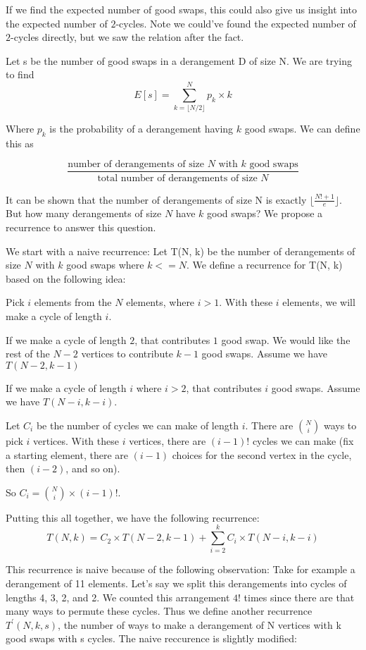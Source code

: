 \documentclass{article}
\begin{document}
If we find the expected number of good swaps, this could also give us insight into the expected number of $2$-cycles.
Note we could've found the expected number of $2$-cycles directly, but we saw the relation after the fact.

Let s be the number of good swaps in a derangement D of size N. We are trying to find
\[ E[s] = \sum_{k = \lfloor N/2 \rfloor}^{N} p_k \times k \]

Where $p_k$ is the probability of a derangement having $k$ good swaps. We can define this as

\[ \frac{\text{number of derangements of size $N$ with $k$ good swaps}}{\text{total number of derangements of size $N$}} \]

It can be shown that the number of derangements of size N is exactly $\lfloor \frac{N! + 1}{e} \rfloor$.
But how many derangements of size $N$ have $k$ good swaps? We propose a recurrence to answer this question.

We start with a naive recurrence:
Let T(N, k) be the number of derangements of size $N$ with $k$ good swaps where
$k <= N$.
We define a recurrence for T(N, k) based on the following idea:

Pick $i$ elements from the $N$ elements, where $i > 1$. With these $i$ elements, we will make a cycle of length $i$.

If we make a cycle of length $2$, that contributes $1$ good swap.
We would like the rest of the $N - 2$ vertices to contribute $k - 1$
good swaps. Assume we have $T(N - 2, k - 1)$

If we make a cycle of length $i$ where $i > 2$, that contributes
$i$ good swaps. Assume we have $T(N - i, k - i)$.

Let $C_i$ be the number of cycles we can make of length $i$.
There are ${N \choose i}$ ways to pick $i$ vertices. With these $i$ vertices,
there are $(i-1)!$ cycles we can make (fix a starting element, there
are $(i - 1)$ choices for the second vertex in the cycle,
then $(i - 2)$, and so on). 

So $C_i = {N \choose i} \times (i - 1)!$.

Putting this all together, we have the following recurrence:
\[ T(N, k) =
C_2 \times T(N - 2, k - 1) +
\sum_{i = 2}^{k}{C_i \times T(N-i, k-i)} \]

This recurrence is naive because of the following observation:
Take for example a derangement of 11 elements. Let's say we split this
derangements into cycles of lengths 4, 3, 2, and 2. We counted this
arrangement $4!$ times since there are that many ways to permute these
cycles. Thus we define another recurrence $T^\prime(N, k, s)$, the number
of ways to make a derangement of N vertices with k good swaps
with s cycles. The naive reccurence is slightly modified:
\end{document}
